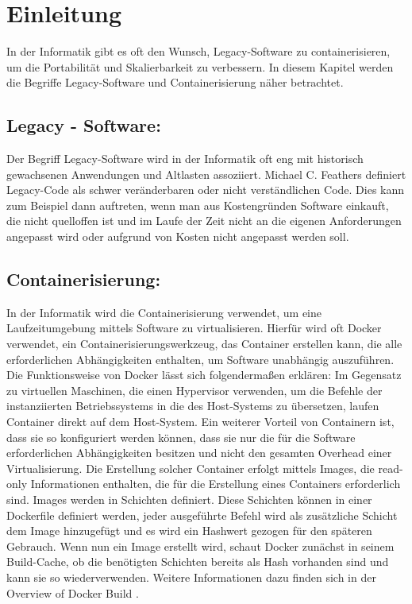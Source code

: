 

\section{Einleitung}

In der Informatik gibt es oft den Wunsch, Legacy-Software zu containerisieren, um die Portabilität und Skalierbarkeit zu verbessern.
In diesem Kapitel werden die Begriffe Legacy-Software und Containerisierung näher betrachtet.
\subsection{Legacy - Software:}
Der Begriff Legacy-Software wird in der Informatik oft eng mit historisch gewachsenen Anwendungen und Altlasten assoziiert.
Michael C. Feathers definiert Legacy-Code als schwer veränderbaren oder nicht verständlichen Code.
Dies kann zum Beispiel dann auftreten, wenn man aus Kostengründen Software einkauft, die nicht quelloffen ist und im Laufe der Zeit nicht an die eigenen Anforderungen angepasst wird oder aufgrund von Kosten nicht angepasst werden soll.
\subsection{Containerisierung:}
In der Informatik wird die Containerisierung verwendet, um eine Laufzeitumgebung mittels Software zu virtualisieren.
Hierfür wird oft Docker verwendet, ein Containerisierungswerkzeug, das Container erstellen kann, die alle erforderlichen Abhängigkeiten enthalten, um Software unabhängig auszuführen.
Die Funktionsweise von Docker lässt sich folgendermaßen erklären: Im Gegensatz zu virtuellen Maschinen, die einen Hypervisor verwenden, um die Befehle der instanziierten Betriebssystems in die des Host-Systems zu übersetzen, laufen Container direkt auf dem Host-System.
Ein weiterer Vorteil von Containern ist, dass sie so konfiguriert werden können, dass sie nur die für die Software erforderlichen Abhängigkeiten besitzen und nicht den gesamten Overhead einer Virtualisierung.
Die Erstellung solcher Container erfolgt mittels Images, die read-only Informationen enthalten, die für die Erstellung eines Containers erforderlich sind. Images werden in Schichten definiert.
Diese Schichten können in einer Dockerfile definiert werden, jeder ausgeführte Befehl wird als zusätzliche Schicht dem Image hinzugefügt und es wird ein Hashwert gezogen für den späteren Gebrauch.
Wenn nun ein Image erstellt wird, schaut Docker zunächst in seinem Build-Cache, ob die benötigten Schichten bereits als Hash vorhanden sind und kann sie so wiederverwenden.
Weitere Informationen dazu finden sich in der Overview of Docker Build \cite{dockerbuild}.
